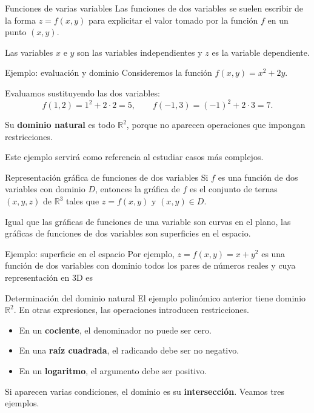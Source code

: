 \documentclass[main.tex]{subfiles}
\begin{document}
\begin{frame}{Funciones de varias variables}
Las funciones de dos variables se suelen escribir de la forma $z=f(x,y)$ para explicitar el valor tomado por la función $f$ en un punto $(x,y)$.
\medskip

Las variables $x$ e $y$ son las variables independientes y $z$ es la variable dependiente.
\end{frame}
\begin{frame}{Ejemplo: evaluación y dominio}
Consideremos la función $f(x,y)=x^2+2y$.
\medskip

Evaluamos sustituyendo las dos variables:
\[
f(1,2)=1^2+2\cdot2=5,\qquad
f(-1,3)=(-1)^2+2\cdot3=7.
\]
\medskip

Su \textbf{dominio natural} es todo $\mathbb R^2$, porque no aparecen operaciones que impongan restricciones.
\medskip

Este ejemplo servirá como referencia al estudiar casos más complejos.
\end{frame}

\begin{frame}{Representación gráfica de funciones de dos variables}
\small Si $f$ es una función de dos variables con dominio $D$, entonces la gráfica de $f$ es el conjunto de ternas $(x,y,z)$ de $\mathbb{R}^3$ tales que $z=f(x,y)$ y $(x,y)\in D$.
\medskip

Igual que las gráficas de funciones de una variable son curvas en el plano, las gráficas de funciones de dos variables son superficies en el espacio.
\end{frame}
\begin{frame}{Ejemplo: superficie en el espacio}
Por ejemplo, $z=f(x,y)=x+y^2$ es una función de dos variables con dominio todos los pares de números reales y cuya representación en 3D es
\end{frame}
\begin{frame}{Determinación del dominio natural}
El ejemplo polinómico anterior tiene dominio $\mathbb R^2$.
En otras expresiones, las operaciones introducen restricciones.
\medskip
\begin{itemize}
\item En un \textbf{cociente}, el denominador no puede ser cero.
\item En una \textbf{raíz cuadrada}, el radicando debe ser no negativo.
\item En un \textbf{logaritmo}, el argumento debe ser positivo.
\end{itemize}
\medskip

Si aparecen varias condiciones, el dominio es su
\textbf{intersección}. Veamos tres ejemplos.
\end{frame}
\end{document}
